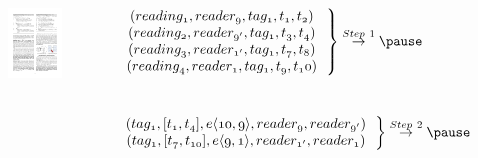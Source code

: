 \begin{frame}
\begin{columns}[c]
\vspace{-15pt}
\begin{figure}[tb]
  \includegraphics[width=\columnwidth]{figures/2-1-12.pdf}
\end{figure}
\tiny{
  $\left.\begin{matrix}
  \mathnormal{(reading_1, reader_{9}, tag_1, t_1, t_2)}~~\\
  \mathnormal{(reading_2, reader_{9'}, tag_1, t_3, t_4)}~~\\
  \mathnormal{(reading_3, reader_{1'}, tag_1, t_7, t_8)}~~\\
  \mathnormal{(reading_4, reader_{1}, tag_1, t_9, t_10)}~~
  \end{matrix}\right\} \overset{Step~1}{\rightarrow} \pause$ \\~\\~\\

  $\left.\begin{matrix}
  \mathnormal{(tag_1, [t_1,t_4], e\langle 10,9 \rangle, reader_{9}, reader_{9'})}~~\\
  \mathnormal{(tag_1, [t_7,t_{10}], e\langle 9,1 \rangle, reader_{1'}, reader_{1})}~~
  \end{matrix}\right\} \overset{Step~2}{\rightarrow} \pause$ \\~\\~\\

}
\end{columns}
\end{frame}
